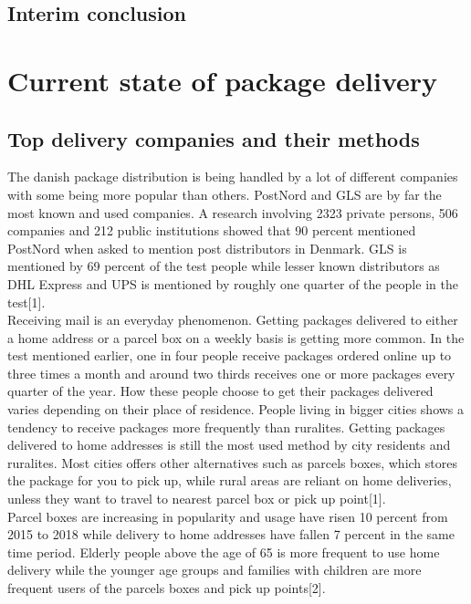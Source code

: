 \documentclass[12pt]{report}
\begin{document}
\subsection{Interim conclusion}




\section{Current state of package delivery}
\subsection{Top delivery companies and their methods}
The danish package distribution is being handled by a lot of different companies with some being more popular than others. PostNord and GLS are by far the most known and used companies. A research involving 2323 private persons, 506 companies and 212 public institutions showed that 90 percent mentioned PostNord when asked to mention post distributors in Denmark. GLS is mentioned by 69 percent of the test people while lesser known distributors as DHL Express and UPS is mentioned by roughly one quarter of the people in the test[1]. \\
Receiving mail is an everyday phenomenon. Getting packages delivered to either a home address or a parcel box on a weekly basis is getting more common. In the test mentioned earlier, one in four people receive packages ordered online up to three times a month and around two thirds receives one or more packages every quarter of the year. How these people choose to get their packages delivered varies depending on their place of residence. People living in bigger cities shows a tendency to receive packages more frequently than ruralites. Getting packages delivered to home addresses is still the most used method by city residents and ruralites. Most cities offers other alternatives such as parcels boxes, which stores the package for you to pick up, while rural areas are reliant on home deliveries, unless they want to travel to nearest parcel box or pick up point[1]. \\
Parcel boxes are increasing in popularity and usage have risen 10 percent from 2015 to 2018 while delivery to home addresses have fallen 7 percent in the same time period. Elderly people above the age of 65 is more frequent to use home delivery while the younger age groups and families with children are more frequent users of the parcels boxes and pick up points[2]. \\
\end{document}
